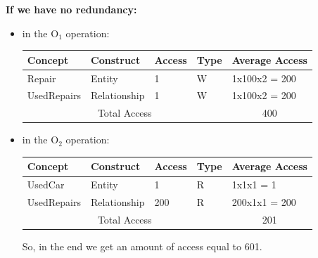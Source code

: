 \textbf{If we have no redundancy:}
\begin{itemize}
\item in the O$_1$ operation: 
\begin{longtable}{|p{}|p{}|p{}|p{}|p{}|}
	\hline
	\textbf{Concept} & \textbf{Construct} & \textbf{Access} & \textbf{Type} & \textbf{Average Access} \\
	\hline 
	Repair & Entity & 1 & W & 1x100x2 = 200 \\
	\hline
	UsedRepairs & Relationship & 1 & W & 1x100x2 = 200 \\
	\hline 
	\multicolumn{4}{|c|}{Total Access} & \multicolumn{1}{c|}{400} \\
	\hline
\end{longtable}
\item in the O$_2$ operation: 
\begin{longtable}{|p{}|p{}|p{}|p{}|p{}|}
	\hline
	\textbf{Concept} & \textbf{Construct} & \textbf{Access} & \textbf{Type} & \textbf{Average Access} \\
	\hline 
	UsedCar & Entity & 1 & R & 1x1x1 = 1 \\
	\hline
	UsedRepairs & Relationship & 200 & R & 200x1x1 = 200 \\
	\hline
	\multicolumn{4}{|c|}{Total Access} & \multicolumn{1}{c|}{201} \\
	\hline
\end{longtable}
\vspace{-0.3cm}
So, in the end we get an amount of access equal to 601. 
\end{itemize}

